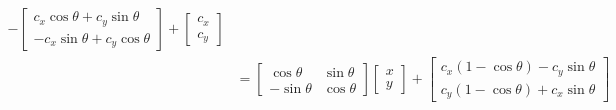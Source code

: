 \begin{equation*}
\begin{split}
          - \begin{bmatrix} c_{x}\cos\theta + c_{y}\sin\theta \\ -c_{x}\sin\theta + c_{y}\cos\theta \end{bmatrix} +
           \begin{bmatrix} c_{x} \\ c_{y} \end{bmatrix} \\
          &= \begin{bmatrix} \cos\theta & \sin\theta \\ -\sin\theta & \cos\theta \end{bmatrix} \begin{bmatrix} x \\ y \end{bmatrix}
          + \begin{bmatrix} c_{x}(1 - \cos\theta) - c_{y}\sin\theta \\ c_{y}(1 - \cos\theta) + c_{x}\sin\theta \end{bmatrix}
\end{split}
\end{equation*}
